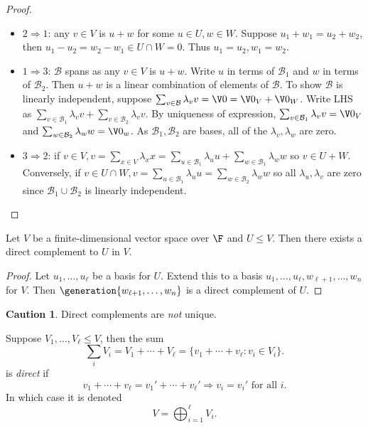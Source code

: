 \documentclass[a4paper]{article}
\newcommand*{\spans}{\generation}
\newcommand*{\basis}{\mathcal}
\theoremstyle{definition}
\newtheorem*{caution}{Caution}
\begin{document}
\begin{proof}\leavevmode
  \begin{itemize}
  \item \(2 \Rightarrow 1\): any \(v\in V\) is \(u+w\) for some \(u\in U, w\in W\). Suppose \(u_1+w_1=u_2+w_2\), then \(u_1-u_2 = w_2-w_1 \in U\cap W = 0\). Thus \(u_1=u_2,w_1=w_2\).
  \item \(1 \Rightarrow 3\): \(\basis B\) spans as any \(v\in V\) is \(u+w\). Write \(u\) in terms of \(\basis B_1\) and \(w\) in terms of \(\basis B_2\). Then \(u+w\) is a linear combination of elements of \(\basis B\). To show \(\basis B\) is linearly independent, suppose \(\sum_{v\in \basis B} \lambda_v v = \V 0 = \V 0_V + \V 0_W\). Write LHS as \(\sum_{v\in \basis B_1} \lambda_vv + \sum_{v\in \basis B_2}\lambda_vv\). By uniqueness of expression, \(\sum_{v\in \basis B_1}\lambda_vv=\V 0_V\) and \(\sum_{w\in \basis B_2}\lambda_ww=\V 0_w\). As \(\basis B_1, \basis B_2\) are bases, all of the \(\lambda_v, \lambda_w\) are zero.
  \item \(3 \Rightarrow 2\): if \(v\in V, v=\sum_{x\in V}\lambda_xx = \sum_{u\in \basis B_1}\lambda_uu + \sum_{w\in \basis B_1}\lambda_ww\) so \(v\in U+W\). Conversely, if \(v\in U\cap W, v = \sum_{u\in \basis B_1}\lambda_uu=\sum_{w\in \basis B_2}\lambda_ww\) so all \(\lambda_u, \lambda_v\) are zero since \(\basis B_1\cup \basis B_2\) is linearly independent.
  \end{itemize}
\end{proof}

\begin{lemma}
  Let \(V\) be a finite-dimensional vector space over \(\F\) and \(U\leq V\). Then there exists a direct complement to \(U\) in \(V\).
\end{lemma}

\begin{proof}
  Let \(u_1,\ldots, u_\ell\) be a basis for \(U\). Extend this to a basis \(u_1,\ldots, u_\ell,w_{\ell+1},\ldots,w_n\) for \(V\). Then \(\spans{w_{\ell+1},\ldots,w_n}\) is a direct complement of \(U\).
\end{proof}

\begin{caution}
  Direct complements are \emph{not} unique.
\end{caution}

\begin{definition}
  Suppose \(V_1,\ldots, V_\ell \leq V\), then the sum
  \[
    \sum_i V_i = V_1+\cdots+V_\ell = \{v_1+\cdots+v_\ell: v_i\in V_i\}.
  \]
  is \emph{direct} if
  \[
    v_1+\cdots+v_\ell = v_1'+\cdots+ v_\ell' \Rightarrow v_i = v_i' \text{ for all } i.
  \]
  In which case it is denoted
  \[
    V = \bigoplus_{i=1}^\ell V_i.
  \]
\end{definition}
\end{document}
